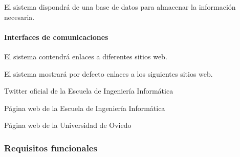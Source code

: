
	\begin{myEnumIH}
		\item El sistema dispondrá de una base de datos para almacenar la información necesaria.
	\end{myEnumIH}


\paragraph*{Interfaces de comunicaciones}


	\begin{myEnumIC}
		\item El sistema contendrá enlaces a diferentes sitios web.
		\item El sistema mostrará por defecto enlaces a los siguientes sitios web.
		\begin{myEnumIC}
			\item Twitter oficial de la Escuela de Ingeniería Informática
			\item Página web de la Escuela de Ingeniería Informática
			\item Página web de la Universidad de Oviedo
		\end{myEnumIC}
	\end{myEnumIC}



\subsubsection{Requisitos funcionales}


